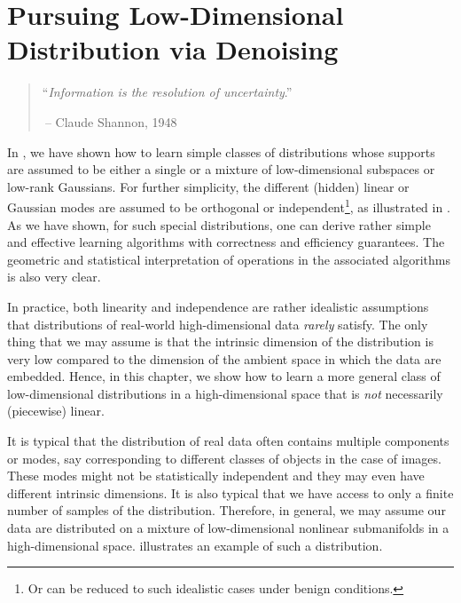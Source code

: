 \documentclass[../../book-main.tex]{subfiles}
\begin{document}
\chapter{Pursuing Low-Dimensional Distribution via Denoising}
\label{ch:general-distribution}\label{ch:compression}
\label{ch:denoising} 

\begin{quote}
\hfill  ``{\textit{Information is the resolution of uncertainty}}.''

$~$\hfill -- Claude Shannon, 1948
\end{quote}
\vspace{5mm}


In , we have shown how to learn simple classes of distributions whose supports are assumed to be either a single or a mixture of low-dimensional subspaces or low-rank Gaussians. For further simplicity, the different (hidden) linear or Gaussian modes are assumed to be orthogonal or independent\footnote{Or can be reduced to such idealistic cases under benign conditions.}, as illustrated in . As we have shown, for such special distributions, one can derive rather simple and effective learning algorithms with correctness and efficiency guarantees. The geometric and statistical interpretation of operations in the associated algorithms is also very clear.

In practice, both linearity and independence are rather idealistic assumptions that distributions of real-world high-dimensional data \textit{rarely} satisfy. The only thing that we may assume is that the intrinsic dimension of the distribution is very low compared to the dimension of the ambient space in which the data are embedded. Hence, in this chapter, we show how to learn a more general class of low-dimensional distributions in a high-dimensional space that is \textit{not} necessarily (piecewise) linear.

It is typical that the distribution of real data often contains multiple components or modes, say corresponding to different classes of objects in the case of images. These modes might not be statistically independent and they may even have different intrinsic dimensions. It is also typical that we have access to only a finite number of samples of the distribution. Therefore, in  general, we may assume our data are distributed on a mixture of low-dimensional nonlinear submanifolds in a high-dimensional space.  illustrates an example of such a distribution.
\end{document}

